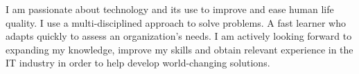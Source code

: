 \begin{bodyfont}

    I am passionate about technology and its use to improve and ease human life quality. I use a multi-disciplined approach to solve problems. A fast learner who adapts quickly to assess an organization’s needs. I am actively looking forward to expanding my knowledge, improve my skills and obtain relevant experience in the IT industry in order to help develop world-changing solutions.

\end{bodyfont}